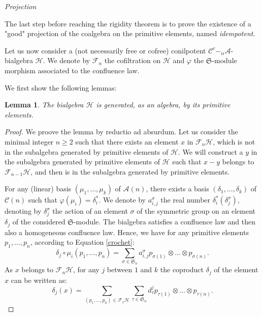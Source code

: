 \documentclass[11pt,leqno]{amsart}
\theoremstyle{definition}
\theoremstyle{plain}
\newtheorem{lemma}[definition]{Lemma}
\newcommand{\Hc}{ \mathcal{H} }
\newcommand{\A}{ \mathcal{A} }
\newcommand{\C}{ \mathcal{C} }
\newcommand{\F}{ \mathcal{F} }
\begin{document}
\emph{Projection}

The last step before reaching the rigidity theorem is to prove the existence of a "good" projection of the coalgebra on the primitive elements, named \emph{idempotent}.

Let us now consider a (not necessarily free or cofree) conilpotent $\C^c-_{\alpha}\A$-bialgebra $\mathcal{H}$. We denote by $\mathcal{F}_n$ the cofiltration on $\mathcal{H}$ and $\varphi$ the $\mathfrak{S}$-module morphism associated to the confluence law.


We first show the following lemmas: 
\begin{lemma}\label{LemGen}
The bialgebra $\mathcal{H}$ is generated, as an algebra, by its primitive elements.
\end{lemma}


\begin{proof} We proove the lemma by reductio ad absurdum. 
Let us consider the minimal integer $n \geq 2$ such that there exists an element $x$ in $\F_n\mathcal{H}$, which is not in the subalgebra generated by primitive elements of $\mathcal{H}$. We will construct a $y$ in the subalgebra generated by primitive elements of $\mathcal{H}$ such that $x-y$ belongs to $\F_{n-1}\mathcal{H}$, and then is in the subalgebra generated by primitive elements.


For any (linear) basis $(\mu_1, \ldots, \mu_k)$ of $\A(n)$, there exists a basis $(\delta_1, \ldots, \delta_k)$ of $\C(n)$ such that $\varphi(\mu_i) = \delta_i^*$. We denote by $a_{i,j}^\sigma$ the real number $\delta_i^*(\delta_j^{\sigma})$, denoting by $\delta_j^{\sigma}$ the action of an element $\sigma$ of the symmetric group on an element $\delta_j$ of the considered $\mathfrak{S}$-module. The bialgebra satisfies a confluence law and then also a homogeneous confluence law. Hence, we have for any primitive elements $p_1, \ldots, p_n$, according to Equation \eqref{crochet}:
\begin{equation}\label{abv}
\delta_j \circ \mu_i(p_1, \ldots, p_n) = \sum_{\sigma \in \mathfrak{S}_n} a_{i,j}^\sigma p_{\sigma(1)} \otimes \ldots \otimes p_{\sigma(n)}. 
\end{equation}
As $x$ belongs to $\F_n\Hc$, for any $j$ between $1$ and $k$ the coproduct $\delta_j$ of the element $x$ can be written as:
\begin{equation}
\delta_j(x) =  \sum_{(p_1, \ldots, p_n) \in \F_1\Hc } \sum_{\tau \in \mathfrak{S}_n} d^j_{\tau} p_{\tau(1)} \otimes \ldots \otimes p_{\tau(n)}.
\end{equation}


\end{proof}
\end{document}
